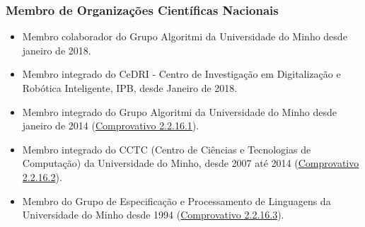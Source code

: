 \documentclass[11pt]{article}
\begin{document}
\subsubsection{Membro de Organizações Científicas Nacionais}
\begin{itemize}
\item {Membro colaborador do Grupo Algoritmi da Universidade do Minho desde janeiro de 2018.}
\item {Membro integrado do CeDRI - Centro de Investigação em Digitalização e Robótica Inteligente, IPB, desde Janeiro de 2018.}
\item {Membro integrado do Grupo Algoritmi da Universidade do Minho desde janeiro de 2014 (\href{run:OutrasActCientif/algoritmi.pdf}{Comprovativo 2.2.16.1}).}
\item {Membro integrado do CCTC (Centro de Ciências e Tecnologias de Computação) da Universidade do Minho, desde 2007 até 2014 (\href{run:OutrasActCientif/cctc.pdf}{Comprovativo 2.2.16.2}).}
\item {Membro do Grupo de Especificação e Processamento de Linguagens da Universidade do Minho desde 1994 (\href{run:OutrasActCientif/gepl.pdf}{Comprovativo 2.2.16.3}).}
\end{itemize}
\end{document}
